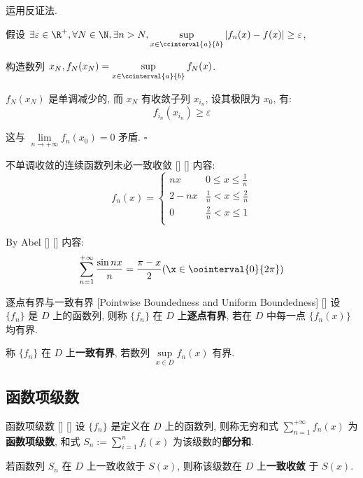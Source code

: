\documentclass[UTF8]{ctexart}
\begin{document}
			\begin{prf}
				运用反证法. 

				假设 \(\exists\varepsilon\in\R^+, \forall N\in\N, \exists n>N, \sup\limits_{x\in\ccinterval{a}{b}}|f_n(x)-f(x)|\geq\varepsilon\), 
				
				构造数列 \(x_N, f_N(x_N)=\sup\limits_{x\in\ccinterval{a}{b}}f_N(x)\). 
				
				\(f_N(x_N)\) 是单调减少的, 而 \(x_N\) 有收敛子列 \(x_{i_n}\), 设其极限为 \(x_0\), 有: 
				\[f_{i_n}(x_{i_n})\geq\varepsilon\]

				这与 \(\lim\limits_{n\to+\infty}f_n(x_0)=0\) 矛盾. \(\square\)
			\end{prf}

			\begin{cxmp}
			    []
			    {不单调收敛的连续函数列未必一致收敛}
			    []
			    []
				内容: 
				\[f_n(x)=
				\begin{cases}
					nx & 0\leq x\leq\frac{1}{n}\\
					2-nx & \frac{1}{n}<x\leq\frac{2}{n}\\
					0 & \frac{2}{n}<x\leq 1\\
				\end{cases}\]
			\end{cxmp}

			\begin{cxmp}
			    []
			    {By Abel}
			    []
			    []
				内容: 
				\[\sum_{n=1}^{+\infty}\frac{\sin nx}{n}=\frac{\pi-x}{2}(\x\in\oointerval{0}{2\pi})\]
			\end{cxmp}

			\begin{dfn}
			    []
			    {逐点有界与一致有界 }
			    [Pointwise Boundedness and Uniform Boundedness]
			    []
				设 \(\{f_n\}\) 是 \(D\) 上的函数列, 则称 \(\{f_n\}\) 在 \(D\) 上\textbf{逐点有界}, 若在 \(D\) 中每一点 \(\{f_n(x)\}\) 均有界. 

				称 \(\{f_n\}\) 在 \(D\) 上\textbf{一致有界}, 若数列 \(\sup\limits_{x\in D}f_n(x)\) 有界. 
			\end{dfn}

		\subsection{函数项级数}
			
			\begin{dfn}
			    []
			    {函数项级数}
			    []
			    []
				设 \(\{f_n\}\) 是定义在 \(D\) 上的函数列, 则称无穷和式 \(\sum\limits_{n=1}^{+\infty}f_n(x)\) 为\textbf{函数项级数}, 和式 \(S_n:=\sum\limits_{i=1}^{n}f_i(x)\) 为该级数的\textbf{部分和}. 

				若函数列 \(S_n\) 在 \(D\) 上一致收敛于 \(S(x)\), 则称该级数在 \(D\) 上\textbf{一致收敛} 于 \(S(x)\). 
			\end{dfn}
\end{document}
